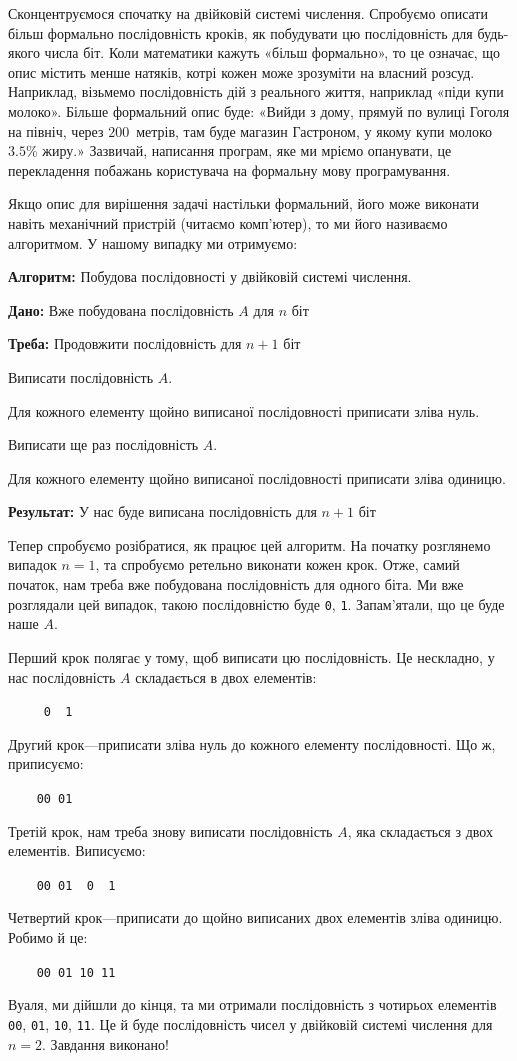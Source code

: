 \documentclass{book}
\newcommand{\algcaption}[1]{\textbf{Алгоритм:} #1.\par}
\newcommand{\alginput}[1]{\textbf{Дано:} #1\par}
\newcommand{\algoutput}[1]{\textbf{Треба:} #1\par}
\newcommand{\algstep}{\item}
\newcommand{\algsummary}[1]{\par\textbf{Результат:} #1\par}
\newcommand{\bitstr}[1]{{\tt #1}}
\begin{document}
Сконцентруємося спочатку на двійковій системі числення.
Спробуємо описати більш формально послідовність кроків, як побудувати цю послідовність для будь-якого числа біт.
Коли математики кажуть «більш формально», то це означає, що опис містить менше натяків, котрі кожен може зрозуміти на власний розсуд.
Наприклад, візьмемо послідовність дій з реального життя, наприклад «піди купи молоко».
Більше формальний опис буде: «Вийди з дому, прямуй по вулиці Гоголя на північ, через $200$~метрів, там буде магазин Гастроном, у якому купи молоко~$3.5$\% жиру.»
Зазвичай, написання програм, яке ми мріємо опанувати,  це перекладення побажань користувача на формальну мову програмування.

Якщо опис для вирішення задачі настільки формальний, його може виконати навіть механічний пристрій (читаємо комп'ютер), то ми його називаємо алгоритмом.
У нашому випадку ми отримуємо:

\begin{algorithm}
  \algcaption{Побудова послідовності у двійковій системі числення}
  \alginput{Вже побудована послідовність $A$ для $n$ біт}
  \algoutput{Продовжити послідовність для $n+1$ біт}
  \begin{algsteps}
    \algstep Виписати послідовність $A$.
    \algstep Для кожного елементу щойно виписаної послідовності приписати зліва нуль.
    \algstep Виписати ще раз послідовність $A$.
    \algstep Для кожного елементу щойно виписаної послідовності приписати зліва одиницю.
  \end{algsteps}
  \algsummary{У нас буде виписана послідовність для $n+1$ біт}
\end{algorithm}

Тепер спробуємо розібратися, як працює цей алгоритм.
На початку розглянемо випадок $n=1$, та спробуємо ретельно виконати кожен крок.
Отже, самий початок, нам треба вже побудована послідовність для одного біта.
Ми вже розглядали цей випадок, такою послідовністю буде \bitstr{0}, \bitstr{1}.
Запам'ятали, що це буде наше $A$.

Перший крок полягає у тому, щоб виписати цю послідовність.
Це нескладно, у нас послідовність $A$ складається в двох елементів:
\par\bitstr{~~~~~0~~1}\par
Другий крок---приписати зліва нуль до кожного елементу послідовності.
Що ж, приписуємо:
\par\bitstr{~~~~00~01}\par
Третій крок, нам треба знову виписати послідовність $A$, яка складається з двох елементів.
Виписуємо:
\par\bitstr{~~~~00~01~~0~~1}\par
Четвертий крок---приписати до щойно виписаних двох елементів зліва одиницю.
Робимо й це:
\par\bitstr{~~~~00~01~10~11}\par
Вуаля, ми дійшли до кінця, та ми отримали послідовність з чотирьох елементів \bitstr{00}, \bitstr{01}, \bitstr{10}, \bitstr{11}.
Це й буде послідовність чисел у двійковій системі числення для $n=2$.
Завдання виконано!
\end{document}
